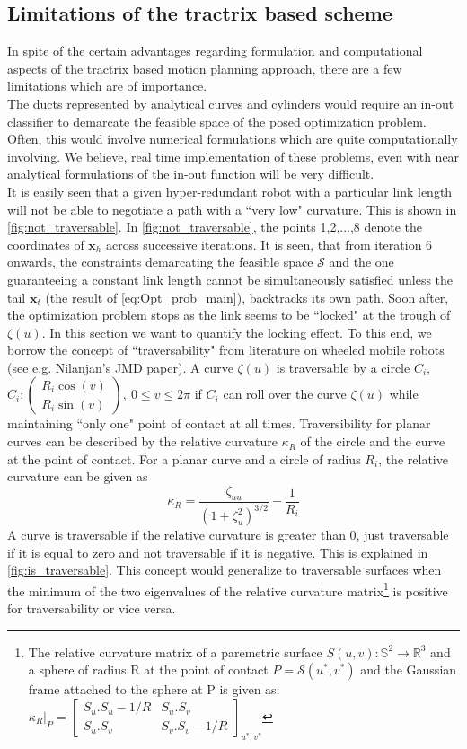 \documentclass[12pt,a4]{article}
\begin{document}
\subsection{Limitations of the tractrix based scheme}
In spite of the certain advantages regarding formulation and computational aspects of the tractrix based motion planning approach, there are a few limitations which are of importance.\\
The ducts represented by analytical curves and cylinders would require an in-out classifier to demarcate the feasible space of the posed optimization problem. Often, this would involve numerical formulations which are quite computationally involving. We believe, real time implementation of these problems, even with near analytical formulations of the in-out function will be very difficult.\\
It is easily seen that a given hyper-redundant robot with a particular link length will not be able to negotiate a path with a ``very low" curvature. This is shown in \cref{fig:not_traversable}. In \cref{fig:not_traversable}, the points 1,2,...,8 denote the coordinates of $\textbf{x}_h$ across successive iterations. It is seen, that from iteration 6 onwards, the constraints demarcating the feasible space $\mathcal{S}$ and the one guaranteeing a constant link length cannot be simultaneously satisfied unless the tail $\textbf{x}_t$ (the result of \cref{eq:Opt_prob_main}), backtracks its own path. Soon after, the optimization problem stops as the link seems to be ``locked" at the trough of $\zeta(u)$. In this section we want to quantify the locking effect. To this end, we borrow the concept of ``traversability" from literature on wheeled mobile robots (see e.g. Nilanjan's JMD paper). A curve $\zeta(u)$ is traversable by a circle $C_i$, $C_i: \left(\begin{array}{c} R_i\cos(v) \\ R_i\sin(v) \end{array}\right), ~ 0 \leq v\leq2\pi $  if $C_i$ can roll over the curve $\zeta(u)$ while maintaining ``only one" point of contact at all times. Traversibility for planar curves can be described by the relative curvature $\kappa_R$ of the circle and the curve at the point of contact. For a planar curve and a circle of radius $R_i$, the relative curvature can be given as \[\kappa_R=\dfrac{\zeta_{uu}}{(1+\zeta_u^2)^{3/2}}-\dfrac{1}{R_i}\] A curve is traversable if the relative curvature is greater than 0, just traversable if it is equal to zero and not traversable if it is negative. This is explained in \cref{fig:is_traversable}. This concept would generalize to traversable surfaces when the minimum of the two eigenvalues of the relative curvature matrix\footnote{The relative curvature matrix of a paremetric surface ${S}(u,v): \mathbb{S}^2\to \mathbb{R}^3$ and a sphere of radius R at the point of contact $P = \mathcal{S}(u^*,v^*)$ and the Gaussian frame attached to the sphere at P is given as: $\kappa_R\vert_P=\left[\begin{array}{cc}
	{S}_u.{S}_u-1/R & {S}_u.{S}_v \\ 
	{S}_u.{S}_v & {S}_v.{S}_v-1/R
	\end{array}\right]_{u^*,v^*} $} is positive for traversability or vice versa.
\end{document}
